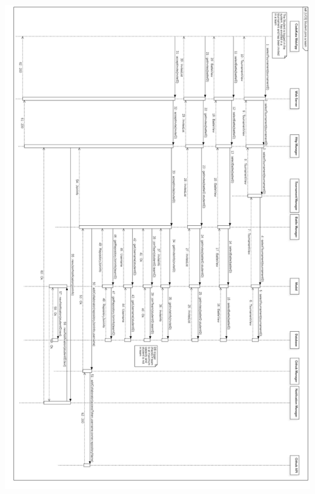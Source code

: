 \documentclass{article}
\begin{document}
\newpage
\begin{center}
    \includegraphics[angle=-90,width=0.8\linewidth]{uc8.jpg}
  \label{fig:uc8}
\end{center}
\end{document}
